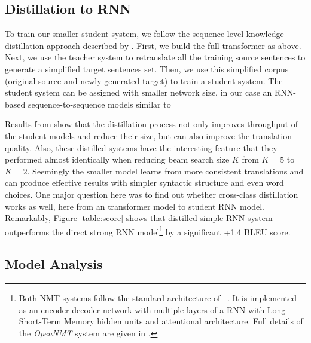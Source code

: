 \documentclass[11pt,a4paper]{article}
\begin{document}
\subsection{Distillation to RNN}
\label{distill}

To train our smaller student system, we follow the sequence-level
knowledge distillation approach described by
. First, we build the full transformer as
above. Next, we use the teacher system to retranslate all the training
source sentences to generate a simplified target sentences set.  Then,
we use this simplified corpus (original source and newly generated
target) to train a student system.  The student system can be assigned
with smaller network size, in our case an RNN-based
sequence-to-sequence models similar to 

Results from  show that the
distillation process not only improves throughput of the student
models and reduce their size, but can also improve the translation
quality. Also,
these distilled systems have the interesting feature that they
performed almost identically when reducing beam search size $K$ from
$K=5$ to $K=2$. Seemingly the smaller model learns from more consistent
translations and can produce effective results with simpler syntactic
structure and even word choices. One major question here was to find
out whether cross-class distillation works as well, here from an
transformer model to student RNN model.
Remarkably, Figure \ref{table:score} shows that distilled simple RNN system outperforms the direct strong RNN model\footnote{Both NMT systems follow the standard architecture of
~. It is implemented as an
encoder-decoder network with multiple layers of a RNN with Long
Short-Term Memory hidden \cite{Hochreiter:1997:LSM:1246443.1246450} units and attentional architecture. Full details of the
\textit{OpenNMT}
system are given in .} by a significant +1.4 BLEU score.


\subsection{Model Analysis}
\label{seq2seq}
\end{document}
